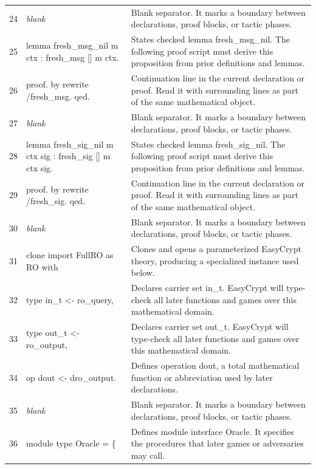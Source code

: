 \documentclass[10pt]{article}
\begin{document}
\begin{longtable}{r L{0.53\textwidth} L{0.37\textwidth}}
24 & {\ttfamily\scriptsize \emph{blank}} & Blank separator.  It marks a boundary between declarations, proof blocks, or tactic phases. \\
25 & {\ttfamily\scriptsize lemma fresh\_msg\_nil m ctx : fresh\_msg [] m ctx.} & States checked lemma fresh\_msg\_nil.  The following proof script must derive this proposition from prior definitions and lemmas. \\
26 & {\ttfamily\scriptsize proof. by rewrite /fresh\_msg. qed.} & Continuation line in the current declaration or proof.  Read it with surrounding lines as part of the same mathematical object. \\
27 & {\ttfamily\scriptsize \emph{blank}} & Blank separator.  It marks a boundary between declarations, proof blocks, or tactic phases. \\
28 & {\ttfamily\scriptsize lemma fresh\_sig\_nil m ctx sig : fresh\_sig [] m ctx sig.} & States checked lemma fresh\_sig\_nil.  The following proof script must derive this proposition from prior definitions and lemmas. \\
29 & {\ttfamily\scriptsize proof. by rewrite /fresh\_sig. qed.} & Continuation line in the current declaration or proof.  Read it with surrounding lines as part of the same mathematical object. \\
30 & {\ttfamily\scriptsize \emph{blank}} & Blank separator.  It marks a boundary between declarations, proof blocks, or tactic phases. \\
31 & {\ttfamily\scriptsize clone import FullRO as RO with} & Clones and opens a parameterized EasyCrypt theory, producing a specialized instance used below. \\
32 & {\ttfamily\scriptsize   type in\_t <- ro\_query,} & Declares carrier set in\_t.  EasyCrypt will type-check all later functions and games over this mathematical domain. \\
33 & {\ttfamily\scriptsize   type out\_t <- ro\_output,} & Declares carrier set out\_t.  EasyCrypt will type-check all later functions and games over this mathematical domain. \\
34 & {\ttfamily\scriptsize   op dout <- dro\_output.} & Defines operation dout, a total mathematical function or abbreviation used by later declarations. \\
35 & {\ttfamily\scriptsize \emph{blank}} & Blank separator.  It marks a boundary between declarations, proof blocks, or tactic phases. \\
36 & {\ttfamily\scriptsize module type Oracle = \{} & Defines module interface Oracle.  It specifies the procedures that later games or adversaries may call. \\

\end{longtable}
\end{document}
